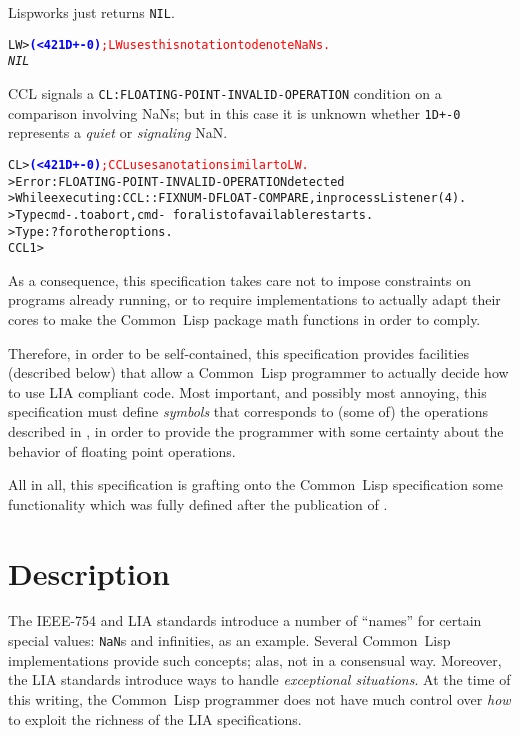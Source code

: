 \documentclass[10pt,fleqn]{article}
\newcommand{\CL}{\textsf{Common~Lisp}}
\newcommand{\code}[1]{\texttt{#1}}
\newcommand{\codeprompt}[1]{\textcolor{blue}{\textbf{#1}}}
\newcommand{\IEEEFPStd}{IEEE-754}
\begin{document}
\noindent
Lispworks just returns \code{NIL}.
\begin{alltt}
LW> \codeprompt{(< 42 1D+-0)} \textcolor{red}{; LW uses this notation to denote NaNs.}
\textit{NIL}
\end{alltt}

\vspace*{3mm}

\noindent
CCL signals a \code{CL:FLOATING-POINT-INVALID-OPERATION} condition on a
comparison involving NaNs; but in this case it is unknown whether
\code{1D+-0} represents a \emph{quiet} or \emph{signaling} NaN.
\begin{alltt}
CL> \codeprompt{(< 42 1D+-0)} \textcolor{red}{; CCL uses a notation similar to LW.}
> Error: FLOATING-POINT-INVALID-OPERATION detected
> While executing: CCL::FIXNUM-DFLOAT-COMPARE, in process Listener(4).
> Type cmd-. to abort, cmd-\ for a list of available restarts.
> Type :? for other options.
CCL 1 > 
\end{alltt}

As a consequence, this specification takes care not to impose
constraints on programs already running, or to require implementations to
actually adapt their cores to make the \CL{} package math functions in
order to comply.

Therefore, in order to be self-contained, this specification provides
facilities (described below) that allow a \CL{} programmer to actually
decide how to use LIA compliant code.  Most important, and
possibly most annoying, this specification must define \emph{symbols}
that corresponds to (some of) the operations described in
\cite{2008:IEEE-754}, in order to provide the programmer with some
certainty about the behavior of floating point operations.

All in all, this specification is grafting onto the \CL{}
specification some functionality which was fully defined after the
publication of \cite{1996:ANSIHyperSpec}.


\newpage

\section{Description}

The \IEEEFPStd{} and LIA standards introduce a number of ``names'' for
certain special values: \code{NaN}s and infinities, as an example.
Several \CL{} implementations provide such concepts; alas, not in a
consensual way.  Moreover, the LIA standards introduce ways to handle
\emph{exceptional situations}. At the time of this writing, the \CL{}
programmer does not have much control over \emph{how} to exploit the
richness of the LIA specifications.
\end{document}

